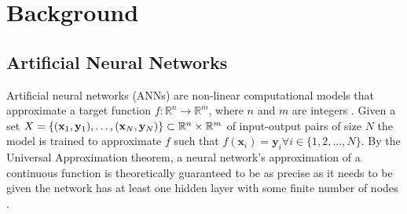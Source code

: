 \chapter{Background}
\label{Background}

\minitoc 

\section{Artificial Neural Networks}
Artificial neural networks (ANNs) are non-linear computational models that approximate 
a target function   $f: \mathbb{R}^n \rightarrow \mathbb{R}^m$, where $n$ and $m$ are 
integers \cite{Bis:06}. Given a set $X = \{ (\mathbf{x}_1, \mathbf{y}_1), \ldots, (\mathbf{x}_N,
 \mathbf{y}_N) \} \subset \mathbb R^n \times \mathbb R^m$ of input-output pairs of size $N$ the model is 
 trained to approximate $f$ such that $f(\mathbf{x}_i) = \mathbf{y}_i \forall i \in \{1, 2, 
 \ldots, N\}$. By the Universal Approximation theorem, a neural network's approximation of a 
 continuous function is theoretically guaranteed to be as precise as it needs to be given the 
 network has at least one hidden layer with some finite number of nodes \cite{HorStiWhi:89}. 

